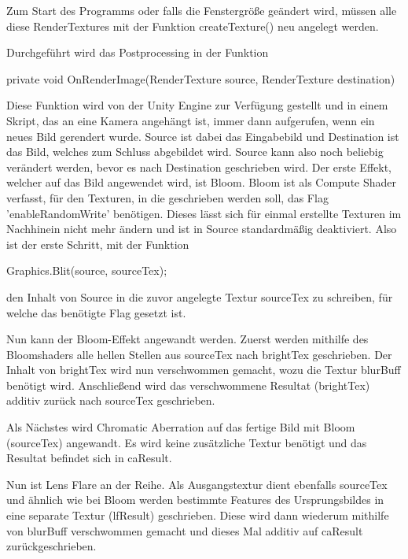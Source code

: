 Zum Start des Programms oder falls die Fenstergrö{\ss}e geändert wird, müssen alle diese RenderTextures mit der Funktion createTexture() neu angelegt werden.

Durchgeführt wird das Postprocessing in der Funktion
\begin{csh}
private void OnRenderImage(RenderTexture source, RenderTexture destination)
\end{csh}
Diese Funktion wird von der Unity Engine zur Verfügung gestellt und in einem Skript, das an eine Kamera angehängt ist, immer dann aufgerufen, wenn ein neues Bild gerendert wurde. Source ist dabei das Eingabebild und Destination ist das Bild, welches zum Schluss abgebildet wird. Source kann also noch beliebig verändert werden, bevor es nach Destination geschrieben wird. Der erste Effekt, welcher auf das Bild angewendet wird, ist Bloom. Bloom ist als Compute Shader verfasst, für den Texturen, in die geschrieben werden soll, das Flag 'enableRandomWrite' benötigen. Dieses lässt sich für einmal erstellte Texturen im Nachhinein nicht mehr ändern und ist in Source standardmäßig deaktiviert. Also ist der erste Schritt, mit der Funktion
\begin{csh}
Graphics.Blit(source, sourceTex);
\end{csh}
 den Inhalt von Source in die zuvor angelegte Textur sourceTex zu schreiben, für welche das benötigte Flag gesetzt ist.


Nun kann der Bloom-Effekt angewandt werden. Zuerst werden mithilfe des Bloomshaders alle hellen Stellen aus sourceTex nach brightTex geschrieben. Der Inhalt von brightTex wird nun verschwommen gemacht, wozu die Textur blurBuff benötigt wird. Anschlie{\ss}end wird das verschwommene Resultat (brightTex) additiv zurück nach sourceTex geschrieben.


Als Nächstes wird Chromatic Aberration auf das fertige Bild mit Bloom (sourceTex) angewandt. Es wird keine zusätzliche Textur benötigt und das Resultat befindet sich in caResult.


Nun ist Lens Flare an der Reihe. Als Ausgangstextur dient ebenfalls sourceTex und ähnlich wie bei Bloom werden bestimmte Features des Ursprungsbildes in eine separate Textur (lfResult) geschrieben. Diese wird dann wiederum mithilfe von blurBuff verschwommen gemacht und dieses Mal additiv auf caResult zurückgeschrieben.

